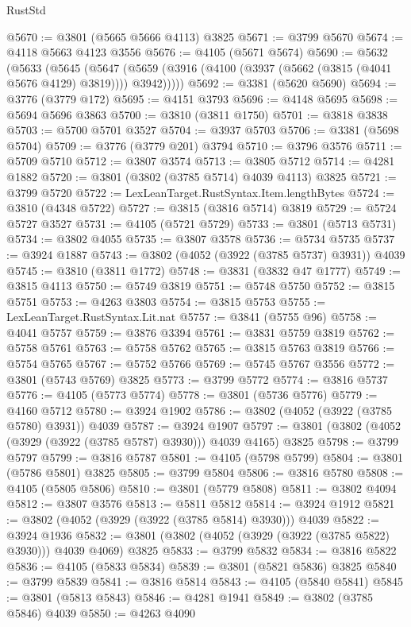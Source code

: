 \begin{lexlean}{RustStd}
\begin{coremodule}
@5670 := @3801 (@5665 @5666 @4113) @3825
@5671 := @3799 @5670
@5674 := @4118 @5663 @4123 @3556
@5676 := @4105 (@5671 @5674)
@5690 := @5632
    (@5633
      (@5645
        (@5647 (@5659 (@3916 (@4100 (@3937 (@5662 (@3815 (@4041 @5676 @4129) @3819)))) @3942)))))
@5692 := @3381 (@5620 @5690)
@5694 := @3776 (@3779 @172)
@5695 := @4151 @3793
@5696 := @4148 @5695
@5698 := @5694 @5696 @3863
@5700 := @3810 (@3811 @1750)
@5701 := @3818 @3838
@5703 := @5700 @5701 @3527
@5704 := @3937 @5703
@5706 := @3381 (@5698 @5704)
@5709 := @3776 (@3779 @201) @3794
@5710 := @3796 @3576
@5711 := @5709 @5710
@5712 := @3807 @3574
@5713 := @3805 @5712
@5714 := @4281 @1882
@5720 := @3801 (@3802 (@3785 @5714) @4039 @4113) @3825
@5721 := @3799 @5720
@5722 := LexLeanTarget.RustSyntax.Item.lengthBytes
@5724 := @3810 (@4348 @5722)
@5727 := @3815 (@3816 @5714) @3819
@5729 := @5724 @5727 @3527
@5731 := @4105 (@5721 @5729)
@5733 := @3801 (@5713 @5731)
@5734 := @3802 @4055
@5735 := @3807 @3578
@5736 := @5734 @5735
@5737 := @3924 @1887
@5743 := @3802 (@4052 (@3922 (@3785 @5737) @3931)) @4039
@5745 := @3810 (@3811 @1772)
@5748 := @3831 (@3832 @47 @1777)
@5749 := @3815 @4113
@5750 := @5749 @3819
@5751 := @5748 @5750
@5752 := @3815 @5751
@5753 := @4263 @3803
@5754 := @3815 @5753
@5755 := LexLeanTarget.RustSyntax.Lit.nat
@5757 := @3841 (@5755 @96)
@5758 := @4041 @5757
@5759 := @3876 @3394
@5761 := @3831 @5759 @3819
@5762 := @5758 @5761
@5763 := @5758 @5762
@5765 := @3815 @5763 @3819
@5766 := @5754 @5765
@5767 := @5752 @5766
@5769 := @5745 @5767 @3556
@5772 := @3801 (@5743 @5769) @3825
@5773 := @3799 @5772
@5774 := @3816 @5737
@5776 := @4105 (@5773 @5774)
@5778 := @3801 (@5736 @5776)
@5779 := @4160 @5712
@5780 := @3924 @1902
@5786 := @3802 (@4052 (@3922 (@3785 @5780) @3931)) @4039
@5787 := @3924 @1907
@5797 := @3801 (@3802 (@4052 (@3929 (@3922 (@3785 @5787) @3930))) @4039 @4165) @3825
@5798 := @3799 @5797
@5799 := @3816 @5787
@5801 := @4105 (@5798 @5799)
@5804 := @3801 (@5786 @5801) @3825
@5805 := @3799 @5804
@5806 := @3816 @5780
@5808 := @4105 (@5805 @5806)
@5810 := @3801 (@5779 @5808)
@5811 := @3802 @4094
@5812 := @3807 @3576
@5813 := @5811 @5812
@5814 := @3924 @1912
@5821 := @3802 (@4052 (@3929 (@3922 (@3785 @5814) @3930))) @4039
@5822 := @3924 @1936
@5832 := @3801 (@3802 (@4052 (@3929 (@3922 (@3785 @5822) @3930))) @4039 @4069) @3825
@5833 := @3799 @5832
@5834 := @3816 @5822
@5836 := @4105 (@5833 @5834)
@5839 := @3801 (@5821 @5836) @3825
@5840 := @3799 @5839
@5841 := @3816 @5814
@5843 := @4105 (@5840 @5841)
@5845 := @3801 (@5813 @5843)
@5846 := @4281 @1941
@5849 := @3802 (@3785 @5846) @4039
@5850 := @4263 @4090

\end{coremodule}
\end{lexlean}
